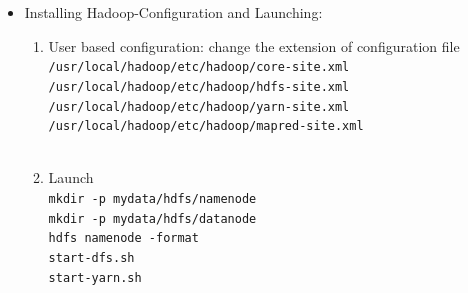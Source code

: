 \documentclass[12pt]{book}
\newcommand{\shellcmd}[1]{\\\indent\texttt{\footnotesize #1}\\}
\begin{document}
\begin{itemize}
\begin{enumerate}
       
\end{enumerate}
\item Installing Hadoop-Configuration and Launching: 
\begin{enumerate}
 \item User based configuration: change the extension of configuration file 
       \shellcmd{/usr/local/hadoop/etc/hadoop/core-site.xml \\\indent 
                /usr/local/hadoop/etc/hadoop/hdfs-site.xml \\\indent 
                /usr/local/hadoop/etc/hadoop/yarn-site.xml\\\indent 
                /usr/local/hadoop/etc/hadoop/mapred-site.xml\\\indent}

 \item Launch
        \shellcmd{mkdir -p mydata/hdfs/namenode\\\indent 
                  mkdir -p mydata/hdfs/datanode  \\\indent 
                  hdfs namenode -format\\\indent 
                  start-dfs.sh\\\indent 
                  start-yarn.sh\\\indent                }
        
\end{enumerate}
\end{itemize}
\end{document}
